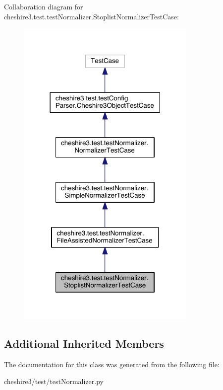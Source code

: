 Collaboration diagram for cheshire3.\-test.\-test\-Normalizer.\-Stoplist\-Normalizer\-Test\-Case\-:
\nopagebreak
\begin{figure}[H]
\begin{center}
\leavevmode
\includegraphics[width=246pt]{classcheshire3_1_1test_1_1test_normalizer_1_1_stoplist_normalizer_test_case__coll__graph}
\end{center}
\end{figure}
\subsection*{Additional Inherited Members}


The documentation for this class was generated from the following file\-:\begin{DoxyCompactItemize}
\item 
cheshire3/test/test\-Normalizer.\-py\end{DoxyCompactItemize}
